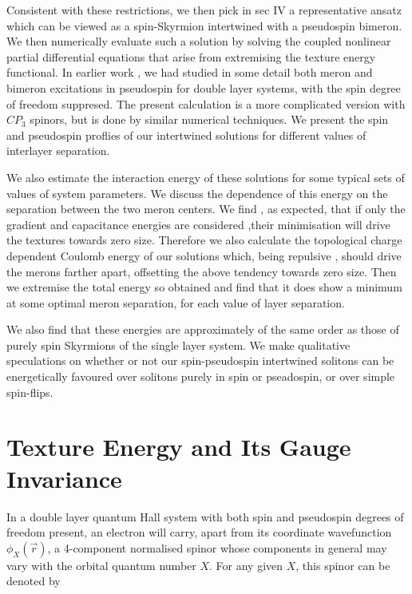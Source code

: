 Consistent with these restrictions, we then pick in sec IV a
representative ansatz which can be viewed as a spin-Skyrmion
intertwined with a pseudospin bimeron. We then numerically
evaluate such a solution by solving the coupled nonlinear
partial differential equations that arise from extremising the
texture energy functional. In earlier work
\cite{Ghosh1},\cite{Ghosh2} we had studied in some detail both
meron and bimeron excitations in pseudospin for double layer
systems, with the spin degree of freedom suppresed. The present
calculation is a more complicated version with $CP_{3}$
spinors, but is done by similar numerical techniques. We present
the spin and pseudospin proflies of our intertwined solutions
for different values of interlayer separation. 

We also estimate the interaction energy of these solutions for
some typical sets of values of system parameters. We discuss
the dependence of this energy on the
separation between the two meron centers. We find , as expected,
that if only the gradient and
capacitance energies are considered ,their minimisation will drive
the textures towards zero size. Therefore we also calculate the
topological charge dependent Coulomb energy of
our solutions which, being repulsive , should drive the merons farther
apart, offsetting the above tendency towards zero size. 
Then we extremise the total energy so obtained and find that it does show a 
minimum at some optimal meron separation, for each value of layer 
separation. 

We also find that these
energies are approximately of the same order as those of purely
spin Skyrmions of the single layer system. We make qualitative speculations 
on whether or not our spin-pseudospin intertwined solitons can be
energetically favoured over solitons purely in spin or
pseadospin, or over simple spin-flips.

\section{Texture Energy and Its Gauge Invariance}
In a double layer quantum Hall system with both spin and pseudospin 
degrees of freedom present, an electron 
will carry, apart from its coordinate wavefunction $\phi_{X}({\vec{r}})$,
a 4-component normalised spinor whose components
in general may vary with the orbital
quantum number $X$. For any given $X$, this spinor can be denoted by

